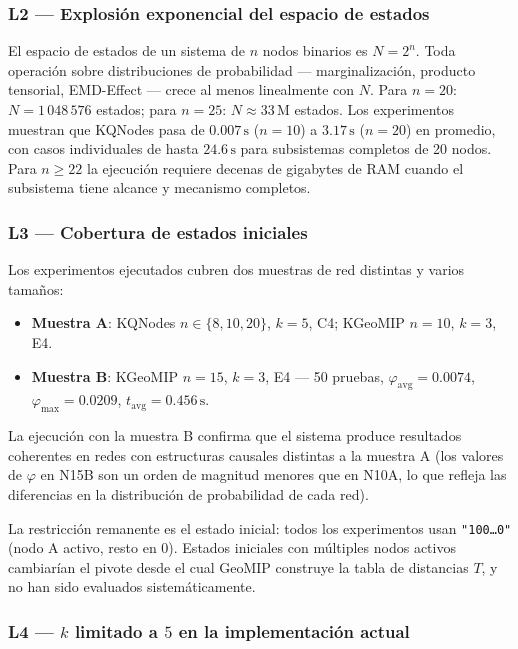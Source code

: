\subsubsection*{L2 — Explosión exponencial del espacio de estados}

El espacio de estados de un sistema de $n$ nodos binarios es $N = 2^n$.
Toda operación sobre distribuciones de probabilidad — marginalización,
producto tensorial, EMD-Effect — crece al menos linealmente con $N$.
Para $n = 20$: $N = 1\,048\,576$ estados; para $n = 25$: $N \approx
33\,\text{M}$ estados.
Los experimentos muestran que KQNodes pasa de $0.007\,\text{s}$
($n=10$) a $3.17\,\text{s}$ ($n=20$) en promedio, con casos individuales
de hasta $24.6\,\text{s}$ para subsistemas completos de 20 nodos.
Para $n \geq 22$ la ejecución requiere decenas de gigabytes de RAM cuando
el subsistema tiene alcance y mecanismo completos.

\subsubsection*{L3 — Cobertura de estados iniciales}

Los experimentos ejecutados cubren dos muestras de red distintas
y varios tamaños:

\begin{itemize}
  \item \textbf{Muestra A}: KQNodes $n \in \{8,10,20\}$, $k=5$, C4;
        KGeoMIP $n=10$, $k=3$, E4.
  \item \textbf{Muestra B}: KGeoMIP $n=15$, $k=3$, E4 —
        50 pruebas, $\varphi_{\text{avg}}=0.0074$,
        $\varphi_{\max}=0.0209$, $t_{\text{avg}}=0.456\,\text{s}$.
\end{itemize}

La ejecución con la muestra B confirma que el sistema produce resultados
coherentes en redes con estructuras causales distintas a la muestra A
(los valores de $\varphi$ en N15B son un orden de magnitud menores que
en N10A, lo que refleja las diferencias en la distribución de probabilidad
de cada red).

La restricción remanente es el estado inicial: todos los experimentos
usan \texttt{"100\ldots0"} (nodo A activo, resto en $0$).
Estados iniciales con múltiples nodos activos cambiarían el pivote desde
el cual GeoMIP construye la tabla de distancias $T$, y no han sido
evaluados sistemáticamente.

\subsubsection*{L4 — $k$ limitado a $5$ en la implementación actual}

